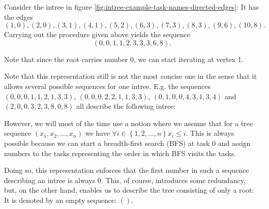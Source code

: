 Consider the intree in figure \ref{fig:intree-example-task-names-directed-edges}: It has the edges
\begin{equation*}
  (1,0), (2,0), (3,1), (4,1), (5,2), (6,3), (7,3), (8,3), (9,6), (10, 8).
\end{equation*}
Carrying out the procedure given above yields the sequence
\begin{equation*}
  (0, 0, 1, 1, 2, 3, 3, 3, 6, 8).
\end{equation*}

Note that since the root carries number 0, we can start iterating at vertex 1. 

Note that this representation still is not the most concise one in the sense that it allows several possible sequences for one intree. E.g. the sequences $(0,0,0,1,1,2,1,3,3)$, $(0,0,0,2,2,1,1,3,3)$, $(0,1,0,0,4,3,1,3,4)$ and $(2,0,0,3,2,3,8,0,8)$ all describe the following intree:

\begin{center}
\end{center}

However, we will most of the time use a notion where we assume that for a tree sequence $(x_1,x_2,\dots, x_n)$ we have $\forall i \in \left\{ 1,2,\dots,n \right\}x_i\leq i$. This is always possible because we can start a breadth-first search (BFS) at task 0 and assign numbers to the tasks representing the order in which BFS visits the tasks.

Doing so, this representation enforces that the first number in such a sequence describing an intree is always 0. This, of course, introduces some redundancy, but, on the other hand, enables us to describe the tree consisting of only a root: It is denoted by an empty sequence: $()$.

